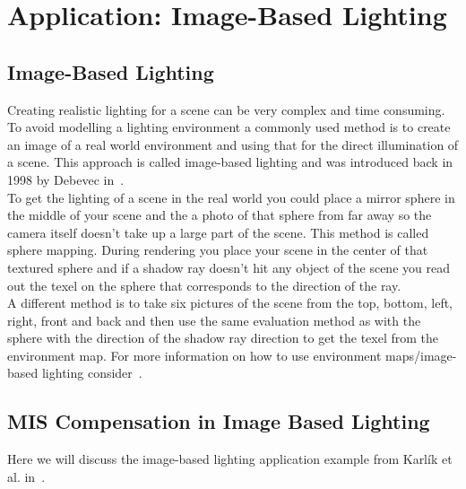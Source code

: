 \chapter{Application: Image-Based Lighting}
\label{ch:application_ibl}


\section{Image-Based Lighting}
\label{sec:ibl}
Creating realistic lighting for a scene can be very complex and time consuming.
To avoid modelling a lighting environment a commonly used method is to create an image of a real world environment
and using that for the direct illumination of a scene.
This approach is called image-based lighting and was introduced back in 1998 by Debevec in~\cite{debevec}.\\
To get the lighting of a scene in the real world you could place a mirror sphere in the middle of your scene
and the a photo of that sphere from far away
so the camera itself doesn't take up a large part of the scene.
This method is called sphere mapping.
During rendering you place your scene in the center of that textured sphere
and if a shadow ray doesn't hit any object of the scene you read out the texel
on the sphere that corresponds to the direction of the ray.\\
A different method is to take six pictures of the scene from the top, bottom, left, right, front and back
and then use the same evaluation method as with the sphere with the direction of the shadow ray direction
to get the texel from the environment map.
For more information on how to use environment maps/image-based lighting consider~\cite{environment_map}.


\section{MIS Compensation in Image Based Lighting}
\label{sec:misc_ibl}
Here we will discuss the image-based lighting application example from Karl\'ik et al. in~\cite[Section~6-7]{Karlik2019}.


